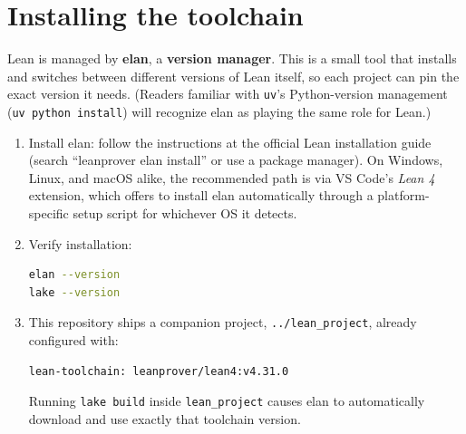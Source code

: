 \section{Installing the toolchain}\label{sec:00-setup:02-installing-toolchain:1}

Lean is managed by \textbf{elan}, a \textbf{version manager}. This is a small tool that installs and switches between different versions of Lean itself, so each project can pin the exact version it needs. (Readers familiar with \texttt{uv}'s Python-version management (\texttt{uv python install}) will recognize elan as playing the same role for Lean.)

\begin{enumerate}
\def\labelenumi{\arabic{enumi}.}
\item
  Install elan: follow the instructions at the official Lean installation guide (search ``leanprover elan install'' or use a package manager). On Windows, Linux, and macOS alike, the recommended path is via VS Code's \emph{Lean 4} extension, which offers to install elan automatically through a platform-specific setup script for whichever OS it detects.
\item
  Verify installation:

\begin{lstlisting}[language=sh]
elan --version
lake --version
\end{lstlisting}
\item
  This repository ships a companion project, \texttt{../lean\_project}, already configured with:

\begin{lstlisting}
lean-toolchain: leanprover/lean4:v4.31.0
\end{lstlisting}

  Running \texttt{lake build} inside \texttt{lean\_project} causes elan to automatically download and use exactly that toolchain version.
\end{enumerate}
